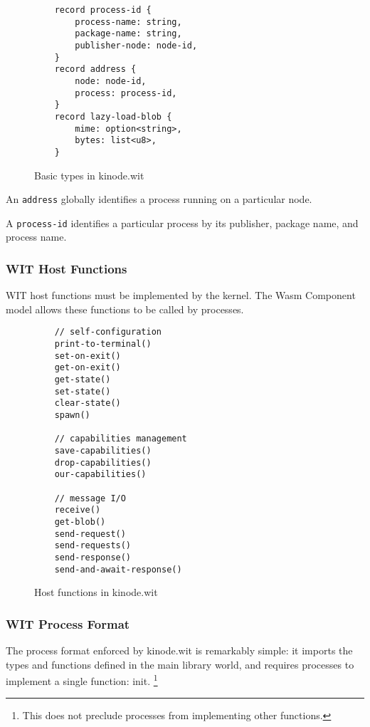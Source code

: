 \documentclass[runningheads]{llncs}
\begin{document}
\begin{figure}[htbp]
    \centering
    \begin{lstlisting}
    record process-id {
        process-name: string,
        package-name: string,
        publisher-node: node-id,
    }
    record address {
        node: node-id,
        process: process-id,
    }
    record lazy-load-blob {
        mime: option<string>,
        bytes: list<u8>,
    }
    \end{lstlisting}
    \caption{Basic types in kinode.wit}
    \label{fig:WIT Types 1}
\end{figure}

An \verb|address| globally identifies a process running on a particular node.

A \verb|process-id| identifies a particular process by its publisher, package name, and process name.

\subsubsection{WIT Host Functions}

WIT host functions must be implemented by the kernel.
The Wasm Component model allows these functions to be called by processes.

\begin{figure}
    \centering
    \begin{lstlisting}
    // self-configuration
    print-to-terminal()
    set-on-exit()
    get-on-exit()
    get-state()
    set-state()
    clear-state()
    spawn()

    // capabilities management
    save-capabilities()
    drop-capabilities()
    our-capabilities()

    // message I/O
    receive()
    get-blob()
    send-request()
    send-requests()
    send-response()
    send-and-await-response()
    \end{lstlisting}
    \caption{Host functions in kinode.wit}
    \label{fig:WIT Functions}
\end{figure}

\subsubsection{WIT Process Format}

The process format enforced by kinode.wit is remarkably simple: it imports the types and functions defined in the main library world, and requires processes to implement a single function: init.
\footnote{This does not preclude processes from implementing other functions.}
\end{document}
